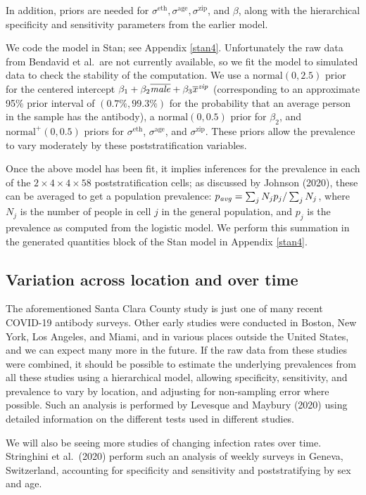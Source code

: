 \documentclass[11pt]{article}
\begin{document}
In addition, priors are needed for $\sigma^{\textrm{eth}}, \sigma^{\textrm{age}}, \sigma^{\textrm{zip}}$, and $\beta$, along with the hierarchical specificity and sensitivity parameters from the earlier model.

We code the model in Stan; see Appendix \ref{stan4}.  Unfortunately the raw data from Bendavid et al.\  are not currently available, so we fit the model to simulated data to check the stability of the computation.  We use a $\mbox{normal}(0,2.5)$ prior for the centered intercept  $\beta_1 + \beta_2\overline{\it male} + \beta_3\overline{x}^{\it zip}$ (corresponding to an approximate 95\% prior interval of $(0.7\%, 99.3\%)$ for the probability that an average person in the sample has the antibody), a $\mbox{normal}(0,0.5)$ prior for $\beta_2$, and $\mbox{normal}^+(0, 0.5)$ priors for $\sigma^{\textrm{eth}}$, $\sigma^{\textrm{age}}$, and $\sigma^{\textrm{zip}}$.  These priors allow the prevalence to vary moderately by these poststratification variables.

Once the above model has been fit, it implies inferences for the prevalence in each of the $2\times 4 \times 4 \times 58$ poststratification cells; as discussed by Johnson (2020), these can be averaged to get a population prevalence:  $p_{\it avg} = \sum_jN_jp_j/\sum_jN_j$, where $N_j$ is the number of people in cell $j$ in the general population, and $p_j$ is the prevalence as computed from the logistic model.  We perform this summation in the generated quantities block of the Stan model in Appendix \ref{stan4}.

\subsection{Variation across location and over time}\label{muiltiple}
The aforementioned Santa Clara County study is just one of many recent COVID-19 antibody surveys.  Other early studies were conducted in Boston, New York, Los Angeles, and Miami, and in various places outside the United States, and we can expect many more in the future.  If the raw data from these studies were combined, it should be possible to estimate the underlying prevalences from all these studies using a hierarchical model, allowing specificity, sensitivity, and prevalence to vary by location, and adjusting for non-sampling error where possible.  Such an analysis is performed by Levesque and Maybury (2020) using detailed information on the different tests used in different studies.

We will also be seeing more studies of changing infection rates over time.  Stringhini et al.\ (2020) perform such an analysis of weekly surveys in Geneva, Switzerland, accounting for specificity and sensitivity and poststratifying by sex and age.
\end{document}
